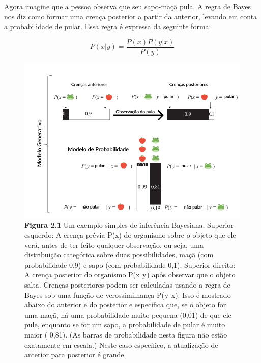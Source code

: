 \documentclass[
  12pt,
]{book}
\begin{document}
Agora imagine que a pessoa observa que seu sapo-maçã pula. A regra de Bayes nos diz como formar uma crença posterior a partir da anterior, levando em conta a probabilidade de pular. Essa regra é expressa da seguinte forma:

\[P(x|y)=\frac{P(x)P(y|x)}{P(y)}\]

\begin{figure}
\centering
\includegraphics{images/Figura2_1.png}
\caption{\textbf{Figura 2.1} Um exemplo simples de inferência Bayesiana. Superior esquerdo: A crença prévia P(x) do organismo sobre o objeto que ele verá, antes de ter feito qualquer observação, ou seja, uma distribuição categórica sobre duas possibilidades, maçã (com probabilidade 0,9) e sapo (com probabilidade 0,1). Superior direito: A crença posterior do organismo P(x \textbar{} y ) após observar que o objeto salta. Crenças posteriores podem ser calculadas usando a regra de Bayes sob uma função de verossimilhança P( y \textbar{} x). Isso é mostrado abaixo do anterior e do posterior e específica que, se o objeto for uma maçã, há uma probabilidade muito pequena (0,01) de que ele pule, enquanto se for um sapo, a probabilidade de pular é muito maior ( 0,81). (As barras de probabilidade nesta figura não estão exatamente em escala.) Neste caso específico, a atualização de anterior para posterior é grande.}
\end{figure}
\end{document}
